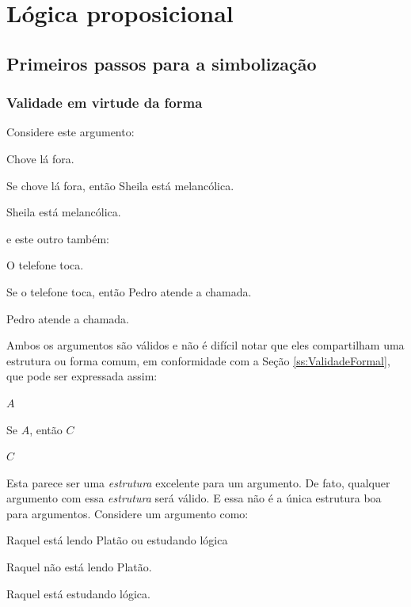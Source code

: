 \normalsize
\part{Lógica proposicional}
\label{ch.TFL}

\chapter{Primeiros passos para a simbolização}

\section{Validade em  virtude da forma}\label{s:ValidityInVirtueOfForm}
Considere este argumento:
	\begin{earg}
		\item[] Chove lá fora.
		\item[] Se chove lá fora, então Sheila está melancólica.
		\item[\therefore] Sheila está melancólica.
	\end{earg}
e este outro também:
	\begin{earg}
		\item[] O telefone toca.
		\item[] Se o telefone toca, então Pedro atende a chamada.
		\item[\therefore] Pedro atende a chamada.
	\end{earg}
Ambos os argumentos são válidos e não é difícil notar que eles compartilham uma estrutura ou forma comum, em conformidade com a Seção \ref{ss:ValidadeFormal}, que pode ser expressada assim:
	\begin{earg}
		\item[] $A$
		\item[] Se $A$, então $C$
		\item[\therefore] $C$
	\end{earg}
Esta parece ser uma \emph{estrutura} excelente para um argumento.
De fato, qualquer argumento com essa \emph{estrutura} será válido.
E essa não é a única estrutura boa para argumentos.
Considere um argumento como:
	\begin{earg}
		\item[] Raquel está lendo Platão ou estudando lógica
		\item[] Raquel não está lendo Platão.
		\item[\therefore] Raquel está estudando lógica.
	\end{earg}
